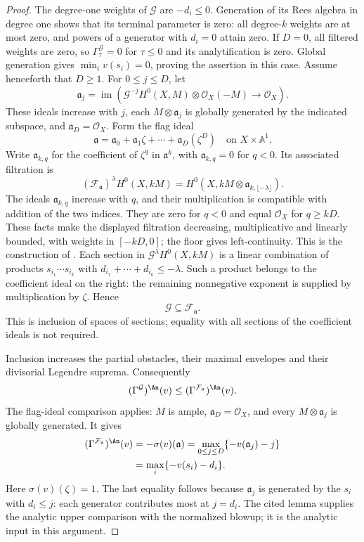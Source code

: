\begin{proof}
The degree-one weights of $\mathcal G$ are $-d_i\leq0$. Generation of its Rees algebra in degree one shows that its terminal parameter is zero: all degree-$k$ weights are at most zero, and powers of a generator with $d_i=0$ attain zero. If $D=0$, all filtered weights are zero, so $\Gamma^{\mathcal G}_\tau=0$ for $\tau\leq0$ and its analytification is zero. Global generation gives $\min_i v(s_i)=0$, proving the assertion in this case. Assume henceforth that $D\geq1$. For $0\leq j\leq D$, let
\[
 \mathfrak a_j=\operatorname{im}\left(
 \mathcal G^{-j}H^0(X,M)\otimes\mathcal O_X(-M)
                  \longrightarrow\mathcal O_X\right).
\]
These ideals increase with $j$, each $M\otimes\mathfrak a_j$ is globally generated by the indicated subspace, and $\mathfrak a_D=\mathcal O_X$. Form the flag ideal
\[
 \mathfrak a=\mathfrak a_0+\mathfrak a_1\zeta+\cdots+
                      \mathfrak a_D(\zeta^D)
                       \quad\text{on }X\times\mathbb A^1.
\]
Write $\mathfrak a_{k,q}$ for the coefficient of $\zeta^q$ in $\mathfrak a^k$, with $\mathfrak a_{k,q}=0$ for $q<0$. Its associated filtration is
\[
 (\mathcal F_{\mathfrak a})^\lambda H^0(X,kM)
   =H^0\!\left(X,kM\otimes
                  \mathfrak a_{k,\lfloor-\lambda\rfloor}\right).
\]
The ideals $\mathfrak a_{k,q}$ increase with $q$, and their multiplication is compatible with addition of the two indices. They are zero for $q<0$ and equal $\mathcal O_X$ for $q\geq kD$. These facts make the displayed filtration decreasing, multiplicative and linearly bounded, with weights in $[-kD,0]$; the floor gives left-continuity. This is the construction of \cite[Definition~4.7, equation~(38) and Proposition~4.8, pp.~302--303]{DXZ23}. Each section in $\mathcal G^\lambda H^0(X,kM)$ is a linear combination of products $s_{i_1}\cdots s_{i_k}$ with $d_{i_1}+\cdots+d_{i_k}\leq-\lambda$. Such a product belongs to the coefficient ideal on the right: the remaining nonnegative exponent is supplied by multiplication by $\zeta$. Hence
\[
                       \mathcal G\subseteq\mathcal F_{\mathfrak a}.
\]
This is inclusion of spaces of sections; equality with all sections of the coefficient ideals is not required.

Inclusion increases the partial obstacles, their maximal envelopes and their divisorial Legendre suprema. Consequently
\[
 (\Gamma^{\mathcal G})^{\An}(v)
       \leq(\Gamma^{\mathcal F_{\mathfrak a}})^{\An}(v).
\]
The flag-ideal comparison \cite[Lemma~4.10, pp.~304--305]{DXZ23} applies: $M$ is ample, $\mathfrak a_D=\mathcal O_X$, and every $M\otimes\mathfrak a_j$ is globally generated. It gives
\[
 \begin{aligned}
 (\Gamma^{\mathcal F_{\mathfrak a}})^{\An}(v)
   &=-\sigma(v)(\mathfrak a)
     =\max_{0\leq j\leq D}\{-v(\mathfrak a_j)-j\}\\
   &=\max_i\{-v(s_i)-d_i\}.
 \end{aligned}
\]
Here $\sigma(v)(\zeta)=1$. The last equality follows because $\mathfrak a_j$ is generated by the $s_i$ with $d_i\leq j$: each generator contributes most at $j=d_i$. The cited lemma supplies the analytic upper comparison with the normalized blowup; it is the analytic input in this argument.


\end{proof}

